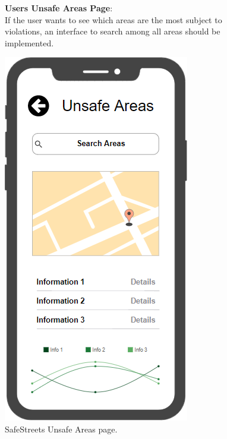\begin{figure}
	\begin{flushleft}
		\textbf{Users Unsafe Areas Page}:\\
		If the user wants to see which areas are the most subject to violations, an interface to search among all areas should be implemented.
	\end{flushleft}
	\centering
	\includegraphics[width=0.6\linewidth]{../RASD/images/mockups/areas}
	\caption{SafeStreets Unsafe Areas page.}
	\label{fig:areas}
\end{figure}
\clearpage
